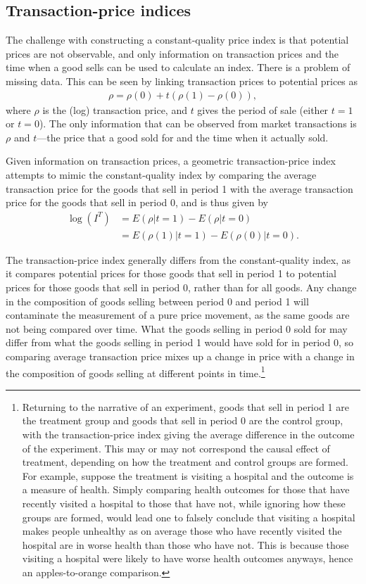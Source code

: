 \documentclass[]{article}
\begin{document}
\hypertarget{transaction-price-indices}{%
\subsection{Transaction-price indices}\label{transaction-price-indices}}

The challenge with constructing a constant-quality price index is that potential prices are not observable, and only information on transaction prices and the time when a good sells can be used to calculate an index. There is a problem of missing data. This can be seen by linking transaction prices to potential prices as
\begin{align*}
\rho = \rho(0) + t(\rho(1) - \rho(0)),
\end{align*}
where \(\rho\) is the (log) transaction price, and \(t\) gives the period of sale (either \(t = 1\) or \(t = 0\)). The only information that can be observed from market transactions is \(\rho\) and \(t\)---the price that a good sold for and the time when it actually sold.

Given information on transaction prices, a geometric transaction-price index attempts to mimic the constant-quality index by comparing the average transaction price for the goods that sell in period 1 with the average transaction price for the goods that sell in period 0, and is thus given by
\begin{align*}
\log(I^{T}) &= E(\rho | t = 1) - E(\rho | t = 0) \\
&= E(\rho(1) | t = 1) - E(\rho(0) | t = 0).
\end{align*}

The transaction-price index generally differs from the constant-quality index, as it compares potential prices for those goods that sell in period 1 to potential prices for those goods that sell in period 0, rather than for all goods. Any change in the composition of goods selling between period 0 and period 1 will contaminate the measurement of a pure price movement, as the same goods are not being compared over time. What the goods selling in period 0 sold for may differ from what the goods selling in period 1 would have sold for in period 0, so comparing average transaction price mixes up a change in price with a change in the composition of goods selling at different points in time.\footnote{Returning to the narrative of an experiment, goods that sell in period 1 are the treatment group and goods that sell in period 0 are the control group, with the transaction-price index giving the average difference in the outcome of the experiment. This may or may not correspond the causal effect of treatment, depending on how the treatment and control groups are formed. For example, suppose the treatment is visiting a hospital and the outcome is a measure of health. Simply comparing health outcomes for those that have recently visited a hospital to those that have not, while ignoring how these groups are formed, would lead one to falsely conclude that visiting a hospital makes people unhealthy as on average those who have recently visited the hospital are in worse health than those who have not. This is because those visiting a hospital were likely to have worse health outcomes anyways, hence an apples-to-orange comparison.}
\end{document}
